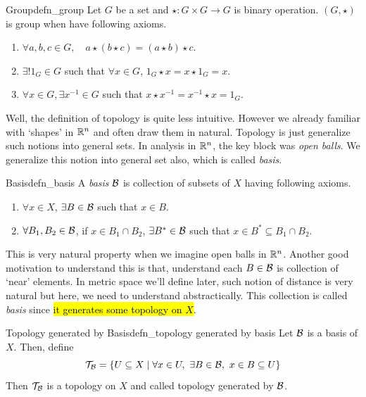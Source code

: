 \documentclass[12pt, a4paper, twoside]{article}
\newcommand{\intn}[1]{\left( {#1} \right)}
\newcommand{\ra}{\rightarrow}
\theoremstyle{plain}
\begin{document}
\begin{defn}{Group}{defn_group}
    Let $G$ be a set and $\star: G \times G \ra G$ is binary operation. $\intn{G, \star}$ is group when have following axioms. 
    \begin{enumerate}
        \item $\forall a, b, c \in G, \quad a \star (b \star c) = (a \star b) \star c$. 
        \item $\exists! 1_G \in G$ such that $\forall x \in G$, $1_G \star x = x \star 1_G = x$. 
        \item $\forall x \in G, \exists x^{-1} \in G$ such that $x \star x^{-1} = x^{-1} \star x = 1_G$. 
    \end{enumerate}
\end{defn}

Well, the definition of topology is quite less intuitive. However we already familiar with 
\lq shapes' in ${\mathbb {R}}^n$ and often draw them in natural. Topology is just generalize such notions into general sets. 
In analysis in ${\mathbb {R}}^n$, the key block was \textit{open balls}. We generalize this notion into general set also, which is called \textit{basis}. 

\begin{defn}{Basis}{defn_basis}
    A \textit{basis} ${\mathcal {B}}$ is collection of subsets of $X$ having following axioms. 
    \begin{enumerate}
        \item $\forall x \in X$, $\exists B \in {\mathcal {B}}$ such that $x \in B$. 
        \item $\forall B_1, B_2 \in {\mathcal {B}}$, if $x \in B_1 \cap B_2$, $\exists B^* \in {\mathcal {B}}$ such that $x \in B^* \subseteq B_1 \cap B_2$. 
    \end{enumerate}
\end{defn}

This is very natural property when we imagine open balls in ${\mathbb {R}}^n$. Another good motivation to understand this is that, 
understand each $B \in {\mathcal {B}}$ is collection of \lq near' elements. In metric space we'll define later, such notion of distance is very natural but here, 
we need to understand abstractically. This collection is called \textit{basis} since \hl{it generates some topology on $X$}.

\begin{defn}{Topology generated by Basis}{defn_topology generated by basis}
    Let ${\mathcal {B}}$ is a basis of $X$. Then, define 
    \[{\mathcal {T}}_{\mathcal {B}} = \{U \subseteq X \mid \forall x \in U,~ \exists B \in {\mathcal {B}},~ x \in B \subseteq U\}\]
    Then ${\mathcal {T}}_{\mathcal {B}}$ is a topology on $X$ and called topology generated by ${\mathcal {B}}$. 
\end{defn}
\end{document}
